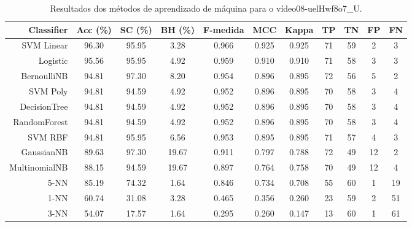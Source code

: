 \begin{table}[!htb]
\centering
\caption{Resultados dos métodos de aprendizado de máquina para o vídeo08-uelHwf8o7_U.}
\label{tab:08-uelHwf8o7_U}
\begin{tabular}{r|c|c|c|c|c|c|c|c|c|c}
\hline\hline
Classifier & Acc (\%) & SC (\%) & BH (\%) & F-medida & MCC & Kappa & TP & TN & FP & FN \\ \hline
SVM Linear & 96.30 & 95.95 & 3.28 & 0.966 & 0.925 & 0.925 & 71 & 59 & 2 & 3 \\ 
Logistic & 95.56 & 95.95 & 4.92 & 0.959 & 0.910 & 0.910 & 71 & 58 & 3 & 3 \\ 
BernoulliNB & 94.81 & 97.30 & 8.20 & 0.954 & 0.896 & 0.895 & 72 & 56 & 5 & 2 \\ 
SVM Poly & 94.81 & 94.59 & 4.92 & 0.952 & 0.896 & 0.895 & 70 & 58 & 3 & 4 \\ 
DecisionTree & 94.81 & 94.59 & 4.92 & 0.952 & 0.896 & 0.895 & 70 & 58 & 3 & 4 \\ 
RandomForest & 94.81 & 94.59 & 4.92 & 0.952 & 0.896 & 0.895 & 70 & 58 & 3 & 4 \\ 
SVM RBF & 94.81 & 95.95 & 6.56 & 0.953 & 0.895 & 0.895 & 71 & 57 & 4 & 3 \\ 
GaussianNB & 89.63 & 97.30 & 19.67 & 0.911 & 0.797 & 0.788 & 72 & 49 & 12 & 2 \\ 
MultinomialNB & 88.15 & 94.59 & 19.67 & 0.897 & 0.764 & 0.758 & 70 & 49 & 12 & 4 \\ 
5-NN & 85.19 & 74.32 & 1.64 & 0.846 & 0.734 & 0.708 & 55 & 60 & 1 & 19 \\ 
1-NN & 60.74 & 31.08 & 3.28 & 0.465 & 0.356 & 0.260 & 23 & 59 & 2 & 51 \\ 
3-NN & 54.07 & 17.57 & 1.64 & 0.295 & 0.260 & 0.147 & 13 & 60 & 1 & 61 \\ 
\hline\hline
\end{tabular}
\end{table}
